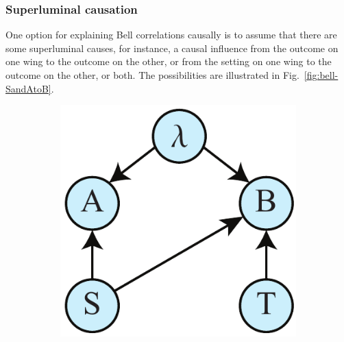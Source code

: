 \documentclass[12pt,onecolumn,nofootinbib]{revtex4-2}
\begin{document}
\subsubsection{Superluminal causation}

One option for explaining Bell correlations causally is to assume that there are some superluminal causes, for instance, a causal influence from the outcome on one wing to the outcome on
the other, or from the setting on one wing to the outcome on the other, or both. 
  The possibilities are illustrated in Fig.~\ref{fig:bell-SandAtoB}.
\begin{figure}[h]
        \begin{subfigure}[b]{0.18\textwidth}
                	\centering
        	\includegraphics[width=\textwidth]{bell-superlum-1}
		\subcaption{}
		\label{fig:bell-StoB}
	\end{subfigure}
	\hspace{5em}
        \begin{subfigure}[b]{0.18\textwidth}
                	\centering

\end{subfigure}
\end{figure}
\end{document}
